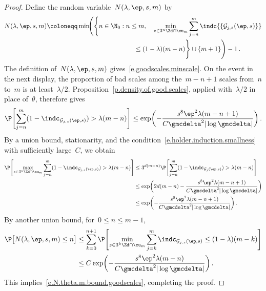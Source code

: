 \documentclass[11pt]{amsart}
\begin{document}
\begin{proof}
Define the random variable~$N(\lambda,\ep,s,m)$ by
\begin{align*}
	N(\lambda,\ep,s,m)
	&\coloneqq
	\min\!\Biggl(
	\Biggl\{n\in\N_0:n\leq m,\quad
	\min_{z\in3^n\Zd\cap\cu_m}
	\sum_{j=n}^{m}\indc{\{\mathcal G_{j,z}(\ep,s)\}}
	\\
	&\hspace{47mm}\leq(1-\lambda)(m-n)
	\Biggr\}\cup\{m+1\}\Biggr)-1
	\,.
\end{align*}
The definition of~$N(\lambda,\ep,s,m)$ gives~\eqref{e.goodscales.minscale}. On the event in the next display, the proportion of bad scales among the~$m-n+1$ scales from~$n$ to~$m$ is at least~$\lambda/2$. Proposition~\ref{p.density.of.good.scales}, applied with~$\lambda/2$ in place of~$\theta$, therefore gives
\begin{equation*}
	\P \Biggl[
	\sum_{j=n}^{m}
	(1-\indc_{\mathcal{G}_{j,z}(\ep,s)})
	>
	\lambda (m-n)  \Biggr]
	\leq
	\exp \biggl(
	-\frac{s^8\ep^2\lambda(m-n+1)}
	{C\gmcdelta^2|\log\gmcdelta|}
	\biggr)
	\,.
\end{equation*}
By a union bound, stationarity, and the condition~\eqref{e.holder.induction.smallness} with sufficiently large~$C$, we obtain
\begin{align*}
	\P \Biggl[
	\max_{z\in 3^n\Zd \cap \cu_m}
	\sum_{j=n}^{m}
	(1-\indc_{\mathcal{G}_{j,z}(\ep,s)})
	>
	\lambda (m-n)  \Biggr]
	&
	\leq
	3^{d(m-n)}
	\P \Biggl[
	\sum_{j=n}^{m}
	(1-\indc_{\mathcal{G}_{j}(\ep,s)})
	>
	\lambda (m-n)  \Biggr]
	\notag \\ &
	\leq
	\exp \biggl(
	2d(m-n)
	-\frac{s^8\ep^2\lambda(m-n+1)}
	{C\gmcdelta^2|\log\gmcdelta|}
	\biggr)
	\notag \\ &
	\leq
	\exp \biggl(
	-\frac{s^8\ep^2\lambda(m-n+1)}
	{C\gmcdelta^2|\log\gmcdelta|}
	\biggr)
	\,.
\end{align*}
By another union bound, for~$0\leq n\leq m-1$,
\begin{align*}
	\P \bigl[ N(\lambda,\ep,s,m) \leq n \bigr]
	&
	\leq
	\sum_{k=0}^{n+1}
	\P \Biggl[
	\min_{z\in 3^k\Zd \cap \cu_m}
	\sum_{j=k}^{m}
	\indc_{\mathcal{G}_{j,z}(\ep,s) }
	\leq
	(1-\lambda) (m-k)  \Biggr]
	\notag \\ &
	\leq
	C\exp \biggl(
	-\frac{s^8\ep^2\lambda(m-n)}
	{C\gmcdelta^2|\log\gmcdelta|}
	\biggr)
	\,.
\end{align*}
This implies~\eqref{e.N.theta.m.bound.goodscales}, completing the proof.
\end{proof}
\end{document}
